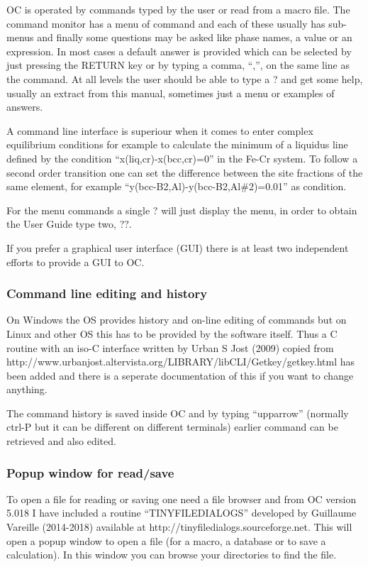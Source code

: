 \documentclass[11pt]{article}
\begin{document}
OC is operated by commands typed by the user or read from a macro
file.  The command monitor has a menu of command and each of these
usually has sub-menus and finally some questions may be asked like
phase names, a value or an expression.  In most cases a default answer
is provided which can be selected by just pressing the RETURN key or
by typing a comma, ``,'', on the same line as the command.  At all
levels the user should be able to type a ? and get some help, usually
an extract from this manual, sometimes just a menu or examples of
answers.

A command line interface is superiour when it comes to enter complex
equilibrium conditions for example to calculate the minimum of a
liquidus line defined by the condition ``x(liq,cr)-x(bcc,cr)=0'' in
the Fe-Cr system.  To follow a second order transition one can set the
difference between the site fractions of the same element, for example
``y(bcc-B2,Al)-y(bcc-B2,Al\#2)=0.01'' as condition.

For the menu commands a single ? will just display the menu, in order to
obtain the User Guide type two, ??.

If you prefer a graphical user interface (GUI) there is at least two
independent efforts to provide a GUI to OC.

\subsubsection{Command line editing and history}

On Windows the OS provides history and on-line editing of commands but
on Linux and other OS this has to be provided by the software itself.
Thus a C routine with an iso-C interface written by Urban S Jost
(2009) copied from
http://www.urbanjost.altervista.org/LIBRARY/libCLI/Getkey/getkey.html
has been added and there is a seperate documentation of this if you
want to change anything.

The command history is saved inside OC and by typing ``upparrow''
(normally ctrl-P but it can be different on different terminals)
earlier command can be retrieved and also edited.

\subsubsection{Popup window for read/save}\label{sc:popup}

To open a file for reading or saving one need a file browser and from
OC version 5.018 I have included a routine ``TINYFILEDIALOGS''
developed by Guillaume Vareille (2014-2018) available at
http://tinyfiledialogs.sourceforge.net.  This will open a popup window
to open a file (for a macro, a database or to save a calculation).  In
this window you can browse your directories to find the file.
\end{document}
